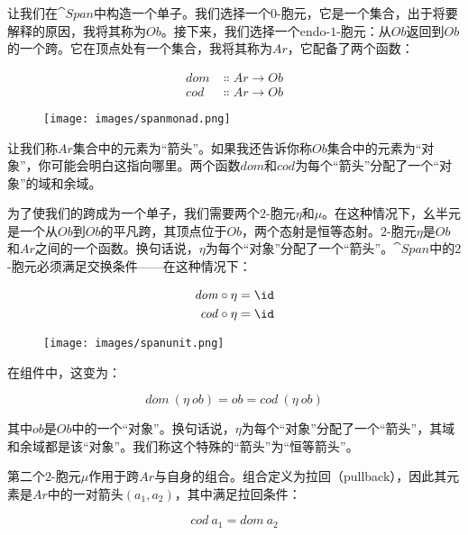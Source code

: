 让我们在$\cat{Span}$中构造一个单子。我们选择一个$0$-胞元，它是一个集合，出于将要解释的原因，我将其称为$\mathit{Ob}$。接下来，我们选择一个endo-$1$-胞元：从$\mathit{Ob}$返回到$\mathit{Ob}$的一个跨。它在顶点处有一个集合，我将其称为$\mathit{Ar}$，它配备了两个函数：

\begin{align*}
  \mathit{dom} & \Colon \mathit{Ar} \to \mathit{Ob} \\
  \mathit{cod} & \Colon \mathit{Ar} \to \mathit{Ob}
\end{align*}

\begin{figure}[H]
  \centering
  \texttt{[image: images/spanmonad.png]}
\end{figure}

\noindent
让我们称$\mathit{Ar}$集合中的元素为“箭头”。如果我还告诉你称$\mathit{Ob}$集合中的元素为“对象”，你可能会明白这指向哪里。两个函数$\mathit{dom}$和$\mathit{cod}$为每个“箭头”分配了一个“对象”的域和余域。

为了使我们的跨成为一个单子，我们需要两个$2$-胞元$\eta$和$\mu$。在这种情况下，幺半元是一个从$\mathit{Ob}$到$\mathit{Ob}$的平凡跨，其顶点位于$\mathit{Ob}$，两个态射是恒等态射。$2$-胞元$\eta$是$\mathit{Ob}$和$\mathit{Ar}$之间的一个函数。换句话说，$\eta$为每个“对象”分配了一个“箭头”。$\cat{Span}$中的$2$-胞元必须满足交换条件——在这种情况下：

\begin{align*}
  \mathit{dom} & \circ \eta = \id \\
  \mathit{cod} & \circ \eta = \id
\end{align*}

\begin{figure}[H]
  \centering
  \texttt{[image: images/spanunit.png]}
\end{figure}

\noindent
在组件中，这变为：

$$\mathit{dom}\ (\eta\ \mathit{ob}) = \mathit{ob} = \mathit{cod}\ (\eta\ \mathit{ob})$$

其中$\mathit{ob}$是$\mathit{Ob}$中的一个“对象”。换句话说，$\eta$为每个“对象”分配了一个“箭头”，其域和余域都是该“对象”。我们称这个特殊的“箭头”为“恒等箭头”。

第二个$2$-胞元$\mu$作用于跨$\mathit{Ar}$与自身的组合。组合定义为拉回（pullback），因此其元素是$\mathit{Ar}$中的一对箭头$(a_1, a_2)$，其中满足拉回条件：

$$\mathit{cod}\ a_1 = \mathit{dom}\ a_2$$

